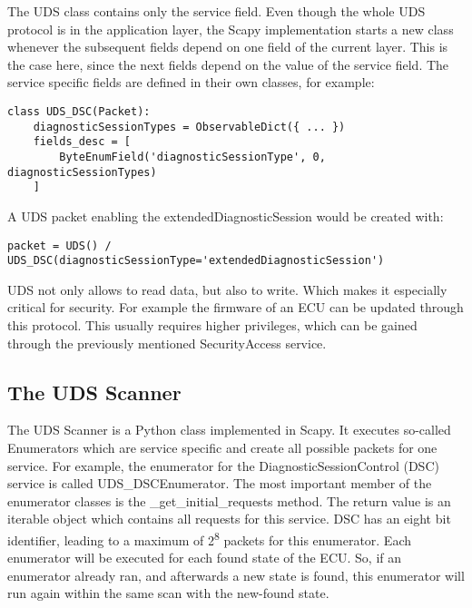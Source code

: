 
The UDS class contains only the service field. Even though the whole UDS protocol is in the application layer, the Scapy implementation starts a new class whenever the subsequent fields depend on one field of the current layer. This is the case here, since the next fields depend on the value of the service field. The service specific fields are defined in their own classes, for example:

\begin{samepage}
\begin{verbatim}
class UDS_DSC(Packet):
    diagnosticSessionTypes = ObservableDict({ ... })
    fields_desc = [
        ByteEnumField('diagnosticSessionType', 0,  diagnosticSessionTypes)
    ]
\end{verbatim}
\end{samepage}

A UDS packet enabling the extendedDiagnosticSession would be created with:

\begin{samepage}
\begin{verbatim}
packet = UDS() / UDS_DSC(diagnosticSessionType='extendedDiagnosticSession')
\end{verbatim}
\end{samepage}

UDS not only allows to read data, but also to write. Which makes it especially critical for security. For example the firmware of an ECU can be updated through this protocol. This usually requires higher privileges, which can be gained through the previously mentioned SecurityAccess service.


\subsection{The UDS Scanner}

The UDS Scanner is a Python class implemented in Scapy. It executes so-called Enumerators which are service specific and create all possible packets for one service.
For example, the enumerator for the DiagnosticSessionControl (DSC) service is called UDS\_DSCEnumerator. The most important member of the enumerator classes is the \_get\_initial\_requests method. The return value is an iterable object which contains all requests for this service. DSC has an eight bit identifier, leading to a maximum of 2\textsuperscript{8} packets for this enumerator. Each enumerator will be executed for each found state of the ECU. So, if an enumerator already ran, and afterwards a new state is found, this enumerator will run again within the same scan with the new-found state.

